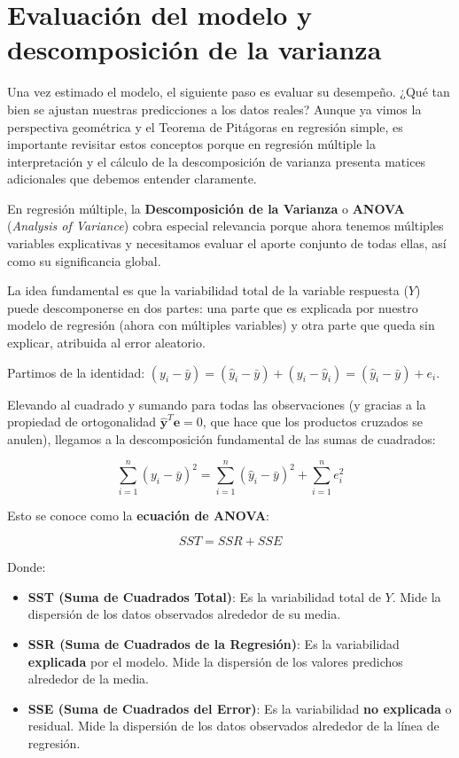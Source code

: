 \documentclass[
  letterpaper,
  DIV=11,
  numbers=noendperiod]{scrreprt}
\providecommand{\tightlist}{%
  \setlength{\itemsep}{0pt}\setlength{\parskip}{0pt}}
\begin{document}
\section{Evaluación del modelo y descomposición de la
varianza}\label{evaluaciuxf3n-del-modelo-y-descomposiciuxf3n-de-la-varianza}

Una vez estimado el modelo, el siguiente paso es evaluar su desempeño.
¿Qué tan bien se ajustan nuestras predicciones a los datos reales?
Aunque ya vimos la perspectiva geométrica y el Teorema de Pitágoras en
regresión simple, es importante revisitar estos conceptos porque en
regresión múltiple la interpretación y el cálculo de la descomposición
de varianza presenta matices adicionales que debemos entender
claramente.

En regresión múltiple, la \textbf{Descomposición de la Varianza} o
\textbf{ANOVA} (\emph{Analysis of Variance}) cobra especial relevancia
porque ahora tenemos múltiples variables explicativas y necesitamos
evaluar el aporte conjunto de todas ellas, así como su significancia
global.

La idea fundamental es que la variabilidad total de la variable
respuesta (\(Y\)) puede descomponerse en dos partes: una parte que es
explicada por nuestro modelo de regresión (ahora con múltiples
variables) y otra parte que queda sin explicar, atribuida al error
aleatorio.

Partimos de la identidad:
\((y_i - \bar{y}) = (\hat{y}_i - \bar{y}) + (y_i - \hat{y}_i) = (\hat{y}_i - \bar{y}) + e_i\).

Elevando al cuadrado y sumando para todas las observaciones (y gracias a
la propiedad de ortogonalidad \(\hat{\mathbf{y}}^T\mathbf{e}=0\), que
hace que los productos cruzados se anulen), llegamos a la descomposición
fundamental de las sumas de cuadrados:

\[\sum_{i=1}^n (y_i - \bar{y})^2 = \sum_{i=1}^n (\hat{y}_i - \bar{y})^2 + \sum_{i=1}^n e_i^2\]

Esto se conoce como la \textbf{ecuación de ANOVA}:

\[SST = SSR + SSE\]

Donde:

\begin{itemize}
\tightlist
\item
  \textbf{SST (Suma de Cuadrados Total)}: Es la variabilidad total de
  \(Y\). Mide la dispersión de los datos observados alrededor de su
  media.
\item
  \textbf{SSR (Suma de Cuadrados de la Regresión)}: Es la variabilidad
  \textbf{explicada} por el modelo. Mide la dispersión de los valores
  predichos alrededor de la media.
\item
  \textbf{SSE (Suma de Cuadrados del Error)}: Es la variabilidad
  \textbf{no explicada} o residual. Mide la dispersión de los datos
  observados alrededor de la línea de regresión.
\end{itemize}
\end{document}
